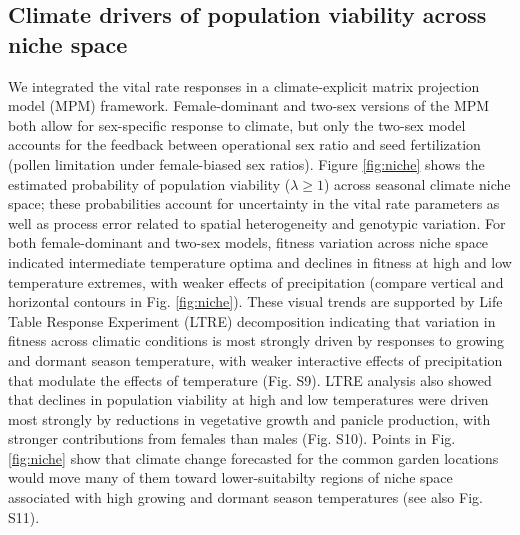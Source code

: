 \documentclass[9pt,twocolumn,twoside,lineno]{pnas-new}
\begin{document}
\subsection*{Climate drivers of population viability across niche space}
We integrated the vital rate responses in a climate-explicit matrix projection model (MPM) framework. 
Female-dominant  and two-sex versions of the MPM  both allow for sex-specific response to climate, but only the two-sex model accounts for the feedback between  operational sex ratio and seed fertilization (pollen limitation under female-biased sex ratios).
Figure \ref{fig:niche} shows the estimated probability of population viability ($\lambda \ge 1$) across seasonal climate niche space; these probabilities account for uncertainty in the vital rate parameters as well as process error related to spatial heterogeneity and genotypic variation. 
For both female-dominant and two-sex models, fitness variation across niche space indicated intermediate temperature optima and declines in fitness at high and low temperature extremes, with weaker effects of precipitation (compare vertical and horizontal contours in Fig. \ref{fig:niche}). 
These visual trends are supported by Life Table Response Experiment (LTRE) decomposition indicating that variation in fitness across climatic conditions is most strongly driven by responses to growing and dormant season temperature, with weaker interactive effects of precipitation that modulate the effects of temperature (Fig. S9). 
LTRE analysis also showed that declines in population viability at high and low temperatures were driven most strongly by reductions in vegetative growth and panicle production, with stronger contributions from females than males (Fig. S10). 
Points in Fig. \ref{fig:niche} show that climate change forecasted for the common garden locations would move many of them toward lower-suitabilty regions of niche space associated with high growing and dormant season temperatures (see also Fig. S11).
\end{document}
